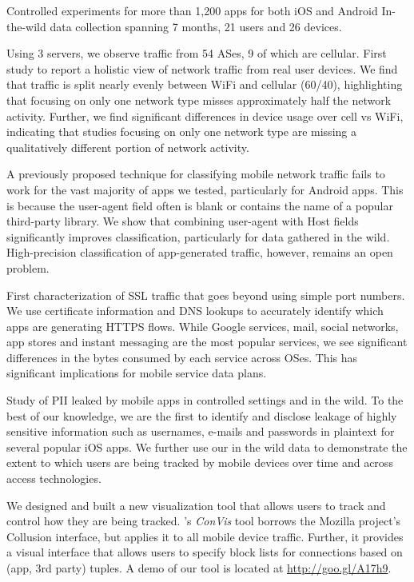 Controlled experiments for more than 1,200 apps for both iOS and Android
In-the-wild data collection spanning 7 months, 21 users and 26 devices.

Using 3 \platname{} servers, we observe traffic from 54 ASes, 9 of which are cellular. 
First study to report a holistic view of network traffic from real user devices. We find that 
traffic is split nearly evenly between WiFi and cellular (60/40), highlighting that focusing 
on only one network type misses approximately half the network activity. Further, we 
find significant differences in device usage over cell vs WiFi, indicating that studies focusing 
on only one network type are missing a qualitatively different portion of network activity. 

A previously proposed technique for classifying mobile network traffic fails to work for the 
vast majority of apps we tested, particularly for Android apps. This is because the user-agent 
field often is blank or contains the name of a popular third-party library. We show that combining 
user-agent with Host fields significantly improves classification, particularly for data gathered 
in the wild. High-precision classification of app-generated traffic, however, remains an open problem. 

First characterization of SSL traffic that goes beyond using simple port numbers. We use 
certificate information and DNS lookups to accurately identify which apps are generating HTTPS flows.
While Google services, mail, social networks, app stores and instant messaging are the most 
popular services, we see significant differences in the bytes consumed by each service across 
OSes. This has significant implications for mobile service data plans.

Study of PII leaked by mobile apps in controlled settings and in the wild. To the best of our knowledge, 
we are the first to identify and disclose leakage of highly sensitive information such as usernames, 
e-mails and passwords in plaintext for several popular iOS apps. We further use our in the wild 
data to demonstrate the extent to which users are being tracked by mobile devices over time 
and across access technologies. 

We designed and built a new visualization tool that allows users to track and control how 
they are being tracked. \platname{}'s \emph{ConVis} tool borrows the Mozilla project's Collusion 
interface, but applies it to all mobile device traffic. Further, it provides a visual interface that allows 
 users to specify block lists for connections based on (app, 3rd party) tuples. A demo of our tool is 
 located at \url{http://goo.gl/A17h9}.
 




